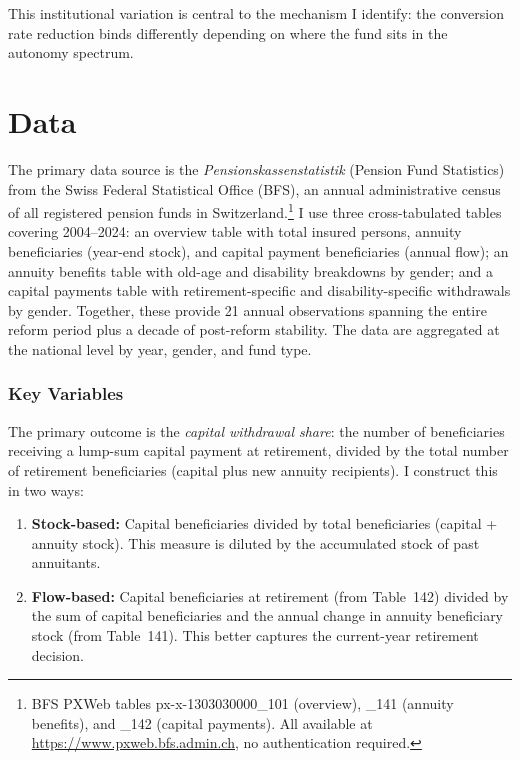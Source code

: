 \documentclass[12pt]{article}
\begin{document}
This institutional variation is central to the mechanism I identify: the conversion rate reduction binds differently depending on where the fund sits in the autonomy spectrum.


\section{Data}
\label{sec:data}

The primary data source is the \textit{Pensionskassenstatistik} (Pension Fund Statistics) from the Swiss Federal Statistical Office (BFS), an annual administrative census of all registered pension funds in Switzerland.\footnote{BFS PXWeb tables px-x-1303030000\_101 (overview), \_141 (annuity benefits), and \_142 (capital payments). All available at \url{https://www.pxweb.bfs.admin.ch}, no authentication required.} I use three cross-tabulated tables covering 2004--2024: an overview table with total insured persons, annuity beneficiaries (year-end stock), and capital payment beneficiaries (annual flow); an annuity benefits table with old-age and disability breakdowns by gender; and a capital payments table with retirement-specific and disability-specific withdrawals by gender. Together, these provide 21 annual observations spanning the entire reform period plus a decade of post-reform stability. The data are aggregated at the national level by year, gender, and fund type.

\subsubsection*{Key Variables} The primary outcome is the \textit{capital withdrawal share}: the number of beneficiaries receiving a lump-sum capital payment at retirement, divided by the total number of retirement beneficiaries (capital plus new annuity recipients). I construct this in two ways:

\begin{enumerate}
\item \textbf{Stock-based:} Capital beneficiaries divided by total beneficiaries (capital + annuity stock). This measure is diluted by the accumulated stock of past annuitants.
\item \textbf{Flow-based:} Capital beneficiaries at retirement (from Table~142) divided by the sum of capital beneficiaries and the annual change in annuity beneficiary stock (from Table~141). This better captures the current-year retirement decision.
\end{enumerate}
\end{document}
